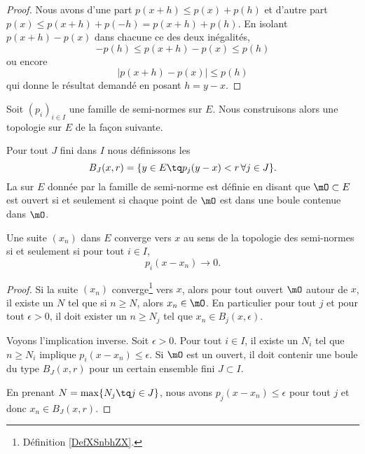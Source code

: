 \begin{proof}
    Nous avons d'une part \( p(x+h)\leq p(x)+p(h)\) et d'autre part \( p(x)\leq p(x+h)+p(-h)=p(x+h)+p(h)\). En isolant \( p(x+h)-p(x)\) dans chacune ce des deux inégalités,
    \begin{equation}
        -p(h)\leq p(x+h)-p(x)\leq p(h)
    \end{equation}
    ou encore
    \begin{equation}
        |p(x+h)-p(x)|\leq p(h)
    \end{equation}
    qui donne le résultat demandé en posant \( h=y-x\).
\end{proof}

Soit \( (p_i)_{i\in I}\) une famille de semi-normes sur \( E\). Nous construisons alors une topologie sur \( E\) de la façon suivante.

\begin{definition}
    Pour tout \( J\) fini dans \( I\) nous définissons les 
    \begin{equation}
        B_J(x,r)=\{ y\in E\tq p_j(y-x)<r\,\forall j\in J \}.
    \end{equation}
    La  sur \( E\) donnée par la famille de semi-norme est définie en disant que \( \mO\subset E\) est ouvert si et seulement si chaque point de \( \mO\) est dans une boule contenue dans \( \mO\).
\end{definition}

\begin{proposition} \label{PropQPzGKVk}
    Une suite \( (x_n)\) dans \( E\) converge vers \( x\) au sens de la topologie des semi-normes si et seulement si pour tout \( i\in I\),
    \begin{equation}
        p_i(x-x_n)\to 0.
    \end{equation}
\end{proposition}

\begin{proof}
    Si la suite \( (x_n)\) converge\footnote{Définition \ref{DefXSnbhZX}.} vers \( x\), alors pour tout ouvert \( \mO\) autour de \( x\), il existe un \( N\) tel que si \( n\geq N\), alors \( x_n\in\mO\). En particulier pour tout \( j\) et pour tout \( \epsilon>0\), il doit exister un \( n\geq N_j\) tel que \( x_n\in B_j(x,\epsilon)\).

    Voyons l'implication inverse. Soit \( \epsilon>0\). Pour tout \( i\in I\), il existe un \( N_i\) tel que \( n\geq N_i\) implique \( p_i(x-x_n)\leq \epsilon\). Si \( \mO\) est un ouvert, il doit contenir une boule du type \( B_J(x,r)\) pour un certain ensemble fini \( J\subset I\).

    En prenant \( N=\max\{ N_j\tq j\in J \}\), nous avons \( p_j(x-x_n)\leq \epsilon\) pour tout \( j\) et donc \( x_n\in B_J(x,r)\).
\end{proof}

